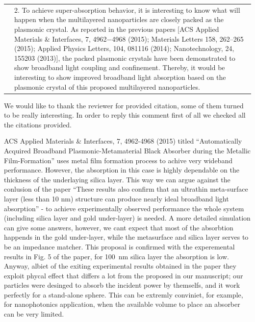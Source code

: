 \documentclass[a4paper]{article}
\begin{document}




\begin{tabular}[!H]{l|p{}}
  \quad & 2. To achieve super-absorption behavior, it is interesting
  to know what will happen when the multilayered nanoparticles are
  closely packed as the plasmonic crystal. As reported in the previous
  papers [ACS Applied Materials \& Interfaces, 7, 4962−4968 (2015);
  Materials Letters 158, 262–265 (2015); Applied Physics Letters, 104,
  081116 (2014); Nanotechnology, 24, 155203 (2013)], the packed
  plasmonic crystals have been demonstrated to show broadband light
  coupling and confinement. Thereby, it would be interesting to show
  improved broadband light absorption based on the plasmonic crystal
  of this proposed multilayered nanoparticles. 
\end{tabular}

We would like to thank the reviewer for provided citation, some of
them turned to be really interesting. In order to reply this comment
first of all we checked all the citations provided.

ACS Applied Materials \& Interfaces, 7, 4962-4968 (2015) titled
``Automatically Acquired Broadband Plasmonic-Metamaterial Black
Absorber during the Metallic Film-Formation'' uses metal film
formation process to achive very wideband performance. However, the
absorption in this case is highly dependable on the thickness of the
underlaying silica layer.  This way we can argue against the conlusion
of the paper ``These results also confirm that an ultrathin
meta-surface layer (less than 10 nm) structure can produce nearly
ideal broadband light absorption'' - to achieve experimentally
observed performance the whole system (including silica layer and gold
under-layer) is needed. A more detailed simulation can give some answers, however,
we cant expect that most of the absorbtion happends in the gold
under-layer, while the metasurface and silica layer serves to be an
impedance matcher.  This proposal is confirmed with the experemental
results in Fig. 5 of the paper, for 100~nm silica layer the absorption
is low. Anyway, albiet of the exiting experimental results obtained in
the paper they exploit phycal effect that differs a lot from the
proposed in our manuscript; our particles were desinged to absorb the
incident power by themselfs, and it work perfectly for a stand-alone
sphere.  This can be extremly conviniet, for example, for
nanophotonics application, when the available volume to place an
absorber can be very limited.
\end{document}
